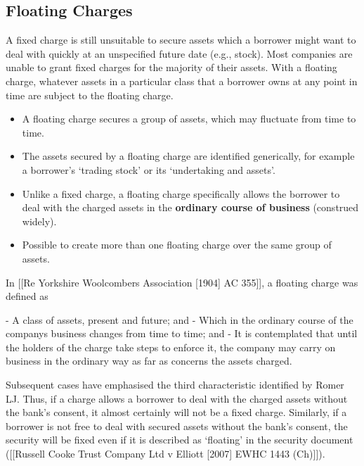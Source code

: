 \documentclass[
]{article}
\newenvironment{Shaded}{}{}
\newcommand{\NormalTok}[1]{#1}
\providecommand{\tightlist}{%
  \setlength{\itemsep}{0pt}\setlength{\parskip}{0pt}}
\begin{document}
\hypertarget{floating-charges}{%
\subsection{Floating Charges}\label{floating-charges}}

A fixed charge is still unsuitable to secure assets which a borrower
might want to deal with quickly at an unspecified future date (e.g.,
stock). Most companies are unable to grant fixed charges for the
majority of their assets. With a floating charge, whatever assets in a
particular class that a borrower owns at any point in time are subject
to the floating charge.

\begin{itemize}
\tightlist
\item
  A floating charge secures a group of assets, which may fluctuate from
  time to time.
\item
  The assets secured by a floating charge are identified generically,
  for example a borrower's `trading stock' or its `undertaking and
  assets'.
\item
  Unlike a fixed charge, a floating charge specifically allows the
  borrower to deal with the charged assets in the \textbf{ordinary
  course of business} (construed widely).
\item
  Possible to create more than one floating charge over the same group
  of assets.
\end{itemize}

\begin{Shaded}
\begin{Highlighting}[]
\NormalTok{In [[Re Yorkshire Woolcombers Association [1904] AC 355]], a floating charge was defined as}

\NormalTok{{-} A class of assets, present and future; and}
\NormalTok{{-} Which in the ordinary course of the company\textquotesingle{}s business changes from time to time; and}
\NormalTok{{-} It is contemplated that until the holders of the charge take steps to enforce it, the company may carry on business in the ordinary way as far as concerns the assets charged.}
\end{Highlighting}
\end{Shaded}

Subsequent cases have emphasised the third characteristic identified by
Romer LJ. Thus, if a charge allows a borrower to deal with the charged
assets without the bank's consent, it almost certainly will not be a
fixed charge. Similarly, if a borrower is not free to deal with secured
assets without the bank's consent, the security will be fixed even if it
is described as `floating' in the security document ({[}{[}Russell Cooke
Trust Company Ltd v Elliott {[}2007{]} EWHC 1443 (Ch){]}{]}).
\end{document}
